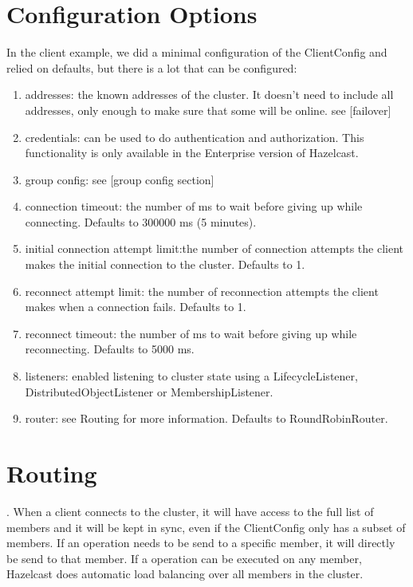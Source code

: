 \section{Configuration Options}
In the client example, we did a minimal configuration of the ClientConfig and relied on defaults, but there is a lot that can be configured:
\begin{enumerate}
\item addresses: the known addresses of the cluster. It doesn't need to include all addresses, only enough to make sure that some will be online. see [failover]
\item credentials: can be used to do authentication and authorization. This functionality is only available in the Enterprise version of Hazelcast.
\item group config: see [group config section]
\item connection timeout: the number of ms to wait before giving up while connecting. Defaults to 300000 ms (5 minutes).
\item initial connection attempt limit:the  number of connection attempts the client makes the initial connection to the cluster. Defaults to 1.
\item reconnect attempt limit: the number of reconnection attempts the client makes when a connection fails. Defaults to 1.
\item reconnect timeout: the number of ms to wait before giving up while reconnecting. Defaults to 5000 ms.
\item listeners: enabled listening to cluster state using a LifecycleListener, DistributedObjectListener or MembershipListener.
\item router: see Routing for more information. Defaults to RoundRobinRouter.
\end{enumerate}

\section{Routing}.
When a client connects to the cluster, it will have access to the full list of members and it will be kept in sync, even if the ClientConfig only has a subset of members. If an operation needs to be send to a specific member, it will directly be send to that member. If a operation can be executed on any member, Hazelcast does automatic load balancing over all members in the cluster. 

